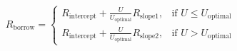 \documentclass[preview]{standalone}
\begin{document}
\begin{align*}
R_{\text{borrow}} = \begin{cases} R_{\text{intercept}} + \frac{U}{U_{\text{optimal}}} R_{\text{slope1}}, & \text{if } U \leq U_{\text{optimal}} \\[6pt] R_{\text{intercept}} + \frac{U}{U_{\text{optimal}}} R_{\text{slope2}}, & \text{if } U > U_{\text{optimal}} \end{cases}
\end{align*}
\end{document}
